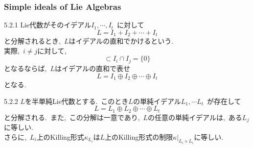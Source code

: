 \documentclass[uplatex,dvipdfmx]{jsarticle}
\begin{document}
\subsubsection{Simple ideals of Lie Algebras}
\begin{mydef}{5.2.1}
    Lie代数がそのイデアル$I_1,\cdots,I_t$~に対して
    \begin{equation*}
        L=I_1+ I_2 + \cdots + I_t
    \end{equation*}
    と分解されるとき,~$L$はイデアルの直和でかけるという.\\
    実際,~$i\neq j$に対して,
    \begin{equation*}
        [I_i,I_j]\subset I_i \cap I_j =\{0\}
    \end{equation*}
    となるならば,~$L$はイデアルの直和で表せ
    \begin{equation*}
        L=I_1 \oplus I_2 \oplus \cdots \oplus I_t
    \end{equation*}
    となる.
\end{mydef}
\begin{mythm}{5.2.2}
     $L$を半単純Lie代数とする.~このとき$L$の単純イデアル$L_1,\cdots L_t$~が存在して
    \begin{equation*}
        L=L_1 \oplus L_2 \oplus \cdots \oplus L_t
    \end{equation*}
    と分解される.~また,~この分解は一意であり,~$L$の任意の単純イデアルは,~ある$L_j$に等しい.\\
    さらに,~$L_i$上のKilling形式$\kappa_{L_i}$は$L$上のKilling形式の制限$\kappa|_{L_i\times L_i}$に等しい.
\end{mythm}
\end{document}
